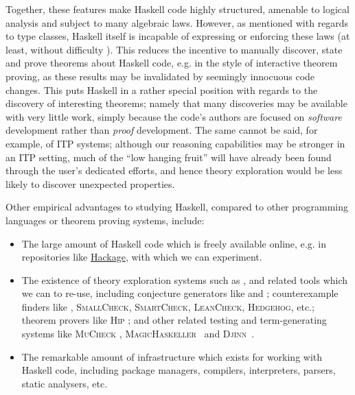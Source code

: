 Together, these features make Haskell code highly structured, amenable to
logical analysis and subject to many algebraic laws. However, as mentioned with
regards to type classes, Haskell itself is incapable of expressing or enforcing
these laws (at least, without difficulty \cite{lindley2014hasochism}). This
reduces the incentive to manually discover, state and prove theorems about
Haskell code, e.g. in the style of interactive theorem proving, as these results
may be invalidated by seemingly innocuous code changes. This puts Haskell in a
rather special position with regards to the discovery of interesting theorems;
namely that many discoveries may be available with very little work, simply
because the code's authors are focused on \emph{software} development rather
than \emph{proof} development. The same cannot be said, for example, of ITP
systems; although our reasoning capabilities may be stronger in an ITP setting,
much of the ``low hanging fruit'' will have already been found through the
user's dedicated efforts, and hence theory exploration would be less likely to
discover unexpected properties.

Other empirical advantages to studying Haskell, compared to other programming
languages or theorem proving systems, include:

\begin{itemize}
\item The large amount of Haskell code which is freely available online, e.g. in
  repositories like \href{http://hackage.haskell.org}{Hackage}, with which we
  can experiment.

\item The existence of theory exploration systems such as \hspec{}, and related
  tools which we can to re-use, including conjecture generators like \qspec{}
  and \speculate{}; counterexample finders like \qcheck{}, \textsc{SmallCheck},
  \textsc{SmartCheck}, \textsc{LeanCheck}, \textsc{Hedgehog}, etc.; theorem
  provers like \textsc{Hip} \cite{rosen2012proving}; and other related testing
  and term-generating systems like \textsc{MuCheck} \cite{le2014mucheck},
  \textsc{MagicHaskeller}~\cite{katayama2011magichaskeller} and
  \textsc{Djinn}~\cite{augustsson2005djinn}.

\item The remarkable amount of infrastructure which exists for working with
  Haskell code, including package managers, compilers, interpreters, parsers,
  static analysers, etc.
\end{itemize}

